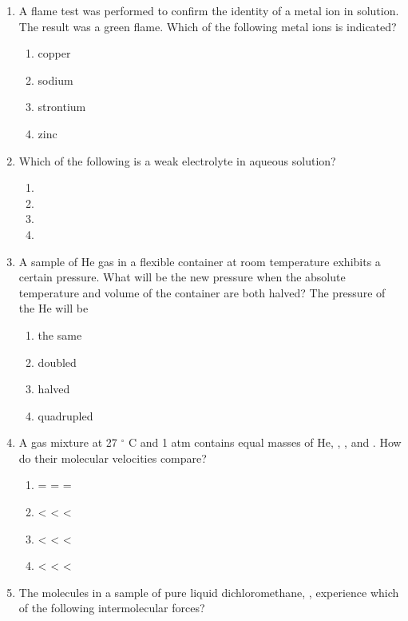 \documentclass[11pt, leqno]{article}
\begin{document}
\begin{enumerate}[leftmargin = *]
\begin{enumerate}
\end{enumerate}
\item A flame test was performed to confirm the identity of a
metal ion in solution. The result was a green flame.
Which of the following metal ions is indicated? 
 \begin{enumerate}
     \item copper
     \item sodium
     \item strontium
     \item zinc
 \end{enumerate}
 \newpage
 \item Which of the following is a weak electrolyte in aqueous
solution?
\begin{enumerate}
    \item {}
    \item {}
    \item {}
    \item {}
\end{enumerate}
\item A sample of He gas in a flexible container at room
temperature exhibits a certain pressure. What will be the
new pressure when the absolute temperature and volume
of the container are both halved? The pressure of the He
will be
\begin{enumerate}
    \item the same
    \item doubled
    \item halved
    \item quadrupled
\end{enumerate}
\item A gas mixture at 27 $^{\circ}$ C and 1 atm contains equal masses
of He, , , and . How do their molecular
velocities compare?
\begin{enumerate}
    \item {} =  =  = 
    \item {} <  <  <  
    \item {}  <  <  < 
    \item {} <  <  < 
\end{enumerate}
\item The molecules in a sample of pure liquid dichloromethane, , experience which of the following intermolecular forces?
\begin{enumerate}[I]

\end{enumerate}
\end{enumerate}
\end{document}
